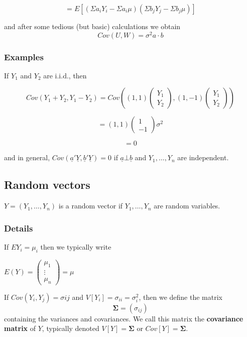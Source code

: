 \documentclass[12pt,a4paper]{article}
\theoremstyle{regla}
\theoremstyle{remark}
\theoremstyle{definition}
\theoremstyle{nonumberbreak}
\begin{document}
$$= E[(\Sigma a_iY_i -\Sigma a_i\mu)(\Sigma b_jY_j -\Sigma b_j\mu )]$$

        

and after some tedious (but basic) calculations we obtain
$$Cov(U,W)=\sigma^2a\cdot b$$
\subsubsection{Examples}
\begin{xmpl}
If $Y_1$ and $Y_2$ are i.i.d., then

$$Cov(Y_1+Y_2, Y_1-Y_2)=Cov((1,1) \left( \begin{array}{ccc}Y_1  \\Y_2 \end{array} \right),  (1,-1) \left( \begin{array}{ccc}Y_1  \\Y_2 \end{array} \right) )$$

$$=(1,1) \left( \begin{array}{ccc} 1  \\-1 \end{array} \right)\sigma^2 $$

$$=0 $$

and in general, $Cov(\underline{a}'\underline{Y}, \underline{b}'\underline{Y})=0$ if $\underline{a}\bot \underline{b}$ and $Y_1,\ldots,Y_n$ are independent.
\end{xmpl}


\subsection{Random vectors}
\begin{fbox}
\begin{minipage}{0.97\textwidth}
$Y= (Y_1, \ldots , Y_n)$ is a random vector if $Y_1, \ldots , Y_n$ are random variables.
\end{minipage}
\end{fbox}
\subsubsection{Details}
\begin{defn}
If $EY_i = \mu_i$ then we typically write

$E(Y)=\left(
\begin{array}{ccc}
\mu_1 \\
\vdots \\
\mu_n
\end{array} \right)=\mu$

If $Cov(Y_i, Y_j) = \sigma{ij}$ and $V[Y_i]=\sigma_{ii} = \sigma_i^2$, then we define the matrix $$\boldsymbol{\Sigma} = (\sigma_{ij})$$
containing the variances and covariances. We call this matrix the {\bf covariance matrix} of $Y$, typically denoted $V[Y] = \boldsymbol{\Sigma}$ or $Cov[Y] = \boldsymbol{\Sigma}$.
\end{defn}
\end{document}
